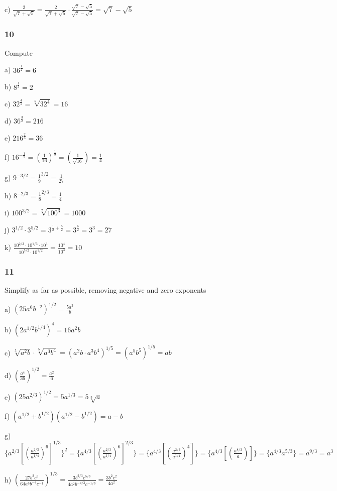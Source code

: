 \documentclass[]{report}
\begin{document}
c) $\frac{2}{\sqrt{7} + \sqrt{5}} = \frac{2}{\sqrt{7} + \sqrt{5}} \cdot  \frac{\sqrt{7} - \sqrt{5}}{\sqrt{7} - \sqrt{5}} = \sqrt{7} - \sqrt{5}$
	
\subsubsection{10}
Compute

a) $36^{\frac{1}{2}} = 6$

b) $8^{\frac{1}{3}} = 2$

c) $32^{\frac{4}{5}} = \sqrt[5]{32^4} = 16$

d) $36^{\frac{3}{2}} = 216$	

e) $216^{\frac{2}{3}} = 36$

f) $16^{-\frac{1}{2}} = (\frac{1}{16})^{\frac{1}{2}} = (\frac{1}{\sqrt{16}}) = \frac{1}{4}$

g) $ 9^{-3/2} = \frac{1}{9}^{3/2} = \frac{1}{27}$

h) $8^{-2/3} = \frac{1}{8}^{2/3} = \frac{1}{4}$

i) $ 100^{3/2} = \sqrt[2]{100^3} = 1000$

j) $3^{1/2} \cdot 3^{5/2} = 3^{\frac{1}{2} + \frac{5}{2}} = 3^{\frac{6}{2}} = 3^3 = 27$

k) $\frac{10^{2/3} \cdot 10^{1/3} \cdot 10^3}{10^{5/2} \cdot 10^{1/2}} = \frac{10^4}{10^3} = 10$

\subsubsection{11}
Simplify as far as possible, removing negative and zero exponents

a) $(25a^6b^{-2})^{1/2} = \frac{5a^3}{b}$


b) $(2a^{1/2}b^{1/4})^4 = 16a^2b$

c) $\sqrt[5]{a^2b} \cdot \sqrt[5]{a^3b^4} = (a^2b \cdot a^3b^4)^{1/5} = (a^5b^5)^{1/5} = ab$

d) $(\frac{a^4}{36})^{1/2} = \frac{a^2}{6}$

e) $(25a^{2/3})^{1/2} = 5a^{1/3} = 5\sqrt[3]{a}$

f) $(a^{1/2} + b^{1/2})(a^{1/2} - b^{1/2}) = a - b$

g) $\{a^{2/3} [(\frac{a^{2/3}}{a^{1/4}})^6]^{1/3}\}^2 = \{a^{4/3} [(\frac{a^{2/3}}{a^{1/4}})^6]^{2/3}\} = \{a^{4/3} [(\frac{a^{2/3}}{a^{1/4}})^4]\} = \{a^{4/3} [(\frac{a^{8/3}}{a})]\} =  \{a^{4/3} a^{5/3}\} = a^{9/3} = a^3$

h) $(\frac{27b^2c^5}{64a^6b^{-4}c^{-1}})^{1/3} =  \frac{3b^{2/3}c^{5/3}}{4a^2b^{-4/3}c^{-1/3}} = \frac{3b^2c^2}{4a^2}$
\end{document}

